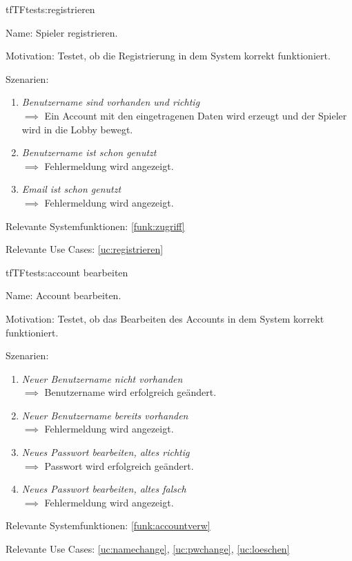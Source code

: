 \begin{description}[leftmargin=5em, style=sameline]

\begin{lhp}{tf}{TF}{tests:registrieren}
	\item [Name:] Spieler registrieren.
	\item [Motivation:] Testet, ob die Registrierung in dem System korrekt funktioniert.
	\item [Szenarien:] \hfill
		\begin{enumerate}
			\item \textit{Benutzername sind vorhanden und richtig} \\ $\implies$ Ein Account mit den eingetragenen Daten wird erzeugt und der Spieler wird in die Lobby bewegt.
			\item \textit{Benutzername ist schon genutzt} \\ $\implies$ Fehlermeldung wird angezeigt.
			\item \textit{Email ist schon genutzt} \\ $\implies$ Fehlermeldung wird angezeigt.
		\end{enumerate}
	\item [Relevante Systemfunktionen:] \ref{funk:zugriff}
	\item [Relevante Use Cases:] \ref{uc:registrieren}
\end{lhp}

\end{description}

\begin{description}[leftmargin=5em, style=sameline]

\begin{lhp}{tf}{TF}{tests:account bearbeiten}
	\item [Name:] Account bearbeiten.
	\item [Motivation:] Testet, ob das Bearbeiten des Accounts in dem System korrekt funktioniert.
	\item [Szenarien:] \hfill
		\begin{enumerate}
			\item \textit{Neuer Benutzername nicht vorhanden} \\ $\implies$ Benutzername wird erfolgreich geändert.
			\item \textit{Neuer Benutzername  bereits vorhanden} \\ $\implies$ Fehlermeldung wird angezeigt.
			\item \textit{Neues Passwort bearbeiten, altes richtig} \\ $\implies$ Passwort wird erfolgreich geändert.
			\item \textit{Neues Passwort bearbeiten, altes falsch} \\ $\implies$ Fehlermeldung wird angezeigt.
		\end{enumerate}
	\item [Relevante Systemfunktionen:] \ref{funk:accountverw}
	\item [Relevante Use Cases:] \ref{uc:namechange}, \ref{uc:pwchange}, \ref{uc:loeschen}
\end{lhp}

\end{description}

